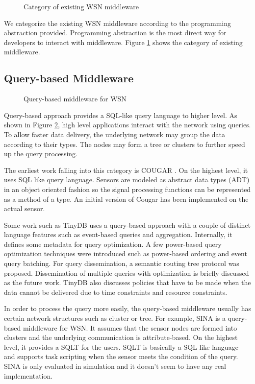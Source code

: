 \begin{figure}
\centering
{}
\caption{Category of existing WSN middleware}
\label{fig:wsn-middleware-category}
\end{figure}

We categorize the existing WSN middleware according to the programming abstraction provided. Programming abstraction is the most direct way for developers to interact with middleware. Figure \ref{fig:wsn-middleware-category} shows the category of existing middleware.

\subsection{Query-based Middleware}

\begin{figure}
\centering
{}
\caption{Query-based middleware for WSN}
\label{fig:wsn-middleware-query}
\end{figure}

Query-based approach provides a SQL-like query language to higher level. As shown in Figure \ref{fig:wsn-middleware-query}, high level applications interact with the network using queries. To allow faster data delivery, the underlying network may group the data according to their types. The nodes may form a tree or clusters to further speed up the query processing.

The earliest work falling into this category is COUGAR \cite{cougar}. On the highest level, it uses SQL like query language. Sensors are modeled as abstract data types (ADT) in an object oriented fashion so the signal processing functions can be represented as a method of a type. An initial version of Cougar has been implemented on the actual sensor.

Some work such as TinyDB \cite{tinydb} uses a query-based approach with a couple of distinct language features such as event-based queries and aggregation. Internally, it defines some metadata for query optimization. A few power-based query optimization techniques were introduced such as power-based ordering and event query batching. For query dissemination, a semantic routing tree protocol was proposed. Dissemination of multiple queries with optimization is briefly discussed as the future work. TinyDB also discusses policies that have to be made when the data cannot be delivered due to time constraints and resource constraints.

In order to process the query more easily, the query-based middleware usually has certain network structures such as cluster or tree. For example, SINA is a query-based middleware for WSN. It assumes that the sensor nodes are formed into clusters and the underlying communication is attribute-based. On the highest level, it provides a SQLT for the users. SQLT is basically a SQL-like language and supports task scripting when the sensor meets the condition of the query. SINA is only evaluated in simulation and it doesn't seem to have any real implementation.

